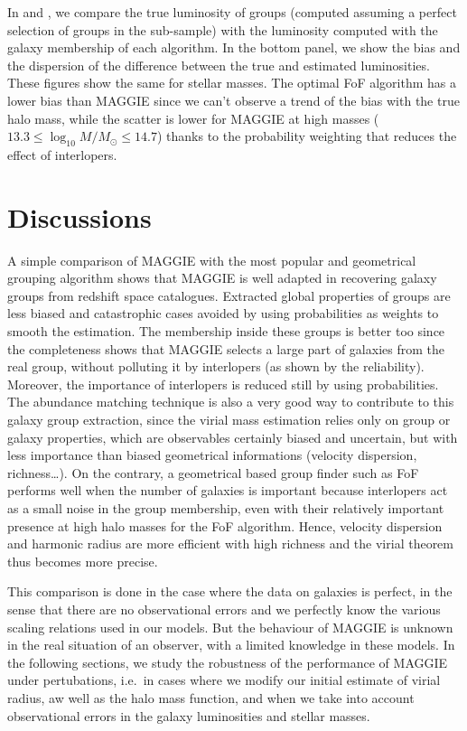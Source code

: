 In  and , we compare the
true luminosity of groups (computed assuming a perfect selection of groups in
the sub-sample) with the luminosity computed with the galaxy membership of each
algorithm. In the bottom panel, we show the bias and the dispersion of the
difference between the true and estimated luminosities. These figures show the
same for stellar masses. The optimal FoF algorithm has a lower bias than MAGGIE
since we can't observe a trend of the bias with the true halo mass, while the
scatter is lower for MAGGIE at high masses ($13.3\leqslant
\log_{10}M/M_\odot\leqslant 14.7$) thanks to the probability weighting that
reduces the effect of interlopers.

\section{Discussions}
\label{sec:maggie_discussions}

A simple comparison of MAGGIE with the most popular and geometrical grouping
algorithm shows that MAGGIE is well adapted in recovering galaxy groups from
redshift space catalogues. Extracted global properties of groups are less
biased and catastrophic cases avoided by using probabilities as weights to
smooth the estimation. The membership inside these groups is better too since
the completeness shows that MAGGIE selects a large part of galaxies from the
real group, without polluting it by interlopers (as shown by the reliability).
Moreover, the importance of interlopers is reduced still by using
probabilities. The abundance matching technique is also a very good way to
contribute to this galaxy group extraction, since the virial mass estimation
relies only on group or galaxy properties, which are observables certainly
biased and uncertain, but with less importance than biased geometrical
informations (velocity dispersion, richness\ldots). On the contrary, a
geometrical based group finder such as FoF performs well when the number of
galaxies is important because interlopers act as a small noise in the group
membership, even with their relatively important presence at high halo masses
for the FoF algorithm. Hence, velocity dispersion and harmonic radius are more
efficient with high richness and the virial theorem thus becomes more precise.

This comparison is done in the case where the data on galaxies is perfect, in
the sense that there are no observational errors and we perfectly know the
various scaling relations used in our models. But the behaviour of MAGGIE is
unknown in the real situation of an observer, with a limited knowledge in these
models. In the following sections, we study the robustness of the performance
of MAGGIE under pertubations, i.e.\ in cases where we modify our initial
estimate of virial radius, aw well as the halo mass function, and when we take
into account observational errors in the galaxy luminosities and stellar
masses.

